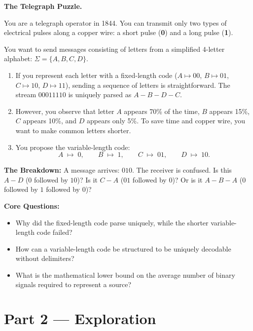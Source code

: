 \begin{puzzlebox}
\textbf{The Telegraph Puzzle.}

You are a telegraph operator in 1844. You can transmit only two types of electrical pulses along a copper wire: a short pulse (\textbf{0}) and a long pulse (\textbf{1}). 

You want to send messages consisting of letters from a simplified 4-letter alphabet: $\Sigma = \{A, B, C, D\}$. 

\begin{enumerate}[label=\textbf{\Alph*.}]
  \item If you represent each letter with a fixed-length code ($A \mapsto 00$, $B \mapsto 01$, $C \mapsto 10$, $D \mapsto 11$), sending a sequence of letters is straightforward. The stream $00011110$ is uniquely parsed as $A-B-D-C$.
  \item However, you observe that letter $A$ appears 70\% of the time, $B$ appears 15\%, $C$ appears 10\%, and $D$ appears only 5\%. To save time and copper wire, you want to make common letters shorter.
  \item You propose the variable-length code:
  \[
    A \;\mapsto\; 0, \qquad B \;\mapsto\; 1, \qquad C \;\mapsto\; 01, \qquad D \;\mapsto\; 10.
  \]
\end{enumerate}

\textbf{The Breakdown:} A message arrives: $010$. The receiver is confused. Is this $A-D$ ($0$ followed by $10$)? Is it $C-A$ ($01$ followed by $0$)? Or is it $A-B-A$ ($0$ followed by $1$ followed by $0$)? 

\medskip
\textbf{Core Questions:}
\begin{itemize}
  \item Why did the fixed-length code parse uniquely, while the shorter variable-length code failed?
  \item How can a variable-length code be structured to be uniquely decodable without delimiters?
  \item What is the mathematical lower bound on the average number of binary signals required to represent a source?
\end{itemize}
\end{puzzlebox}

\bigskip

\section{Part 2 \texorpdfstring{---}{--} Exploration}

